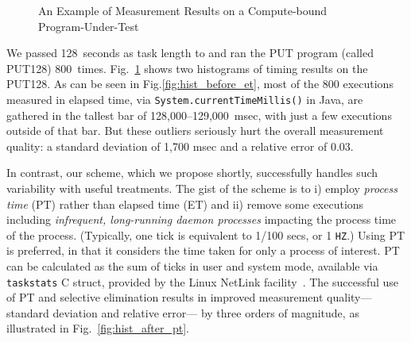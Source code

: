 \documentclass[letter]{ieice}
\begin{document}
\begin{figure}[t]
	\centering
	\caption{An Example of Measurement Results on a \linebreak \hbox{Compute-bound} 
	Program-Under-Test~\label{fig:meas_comp}}
	\vspace{-.3in}
\end{figure} 

We passed 128~seconds as task length to and ran the PUT program (called PUT128) 
800~times. Fig.~\ref{fig:meas_comp} shows two histograms of timing results on the PUT128.
As can be seen in Fig.\ref{fig:hist_before_et}, 
most of the 800 executions measured in elapsed time, 
via  {\tt System.currentTimeMillis()} in Java, are gathered in the tallest bar 
of \hbox{128,000--129,000 msec,} with just a few executions outside of that bar. 
But these outliers seriously hurt the overall measurement quality: 
a standard deviation of 1,700 msec and a relative error of 0.03. 

In contrast, our scheme, which we propose shortly, 
successfully handles such variability with useful treatments. 
The gist of the scheme is to i) employ 
{\em process time} (PT) rather than elapsed time (ET) and 
ii) remove some executions including 
{\em infrequent, \hbox{long-running} daemon processes} impacting 
the process time of the process. 
(Typically, one tick is equivalent to 1/100 secs, or 1 {\tt HZ}.) 
Using PT is preferred, in that it considers 
the time taken for only a process of interest.
PT can be calculated as the sum of ticks 
in user and system mode, available via {\tt taskstats} C struct, 
provided by the Linux NetLink facility~\cite{Netlink}.
The successful use of PT and selective elimination 
results in improved 
measurement quality---standard deviation and relative error---
by three orders of magnitude, 
as illustrated in Fig.~\ref{fig:hist_after_pt}. 
\end{document}
